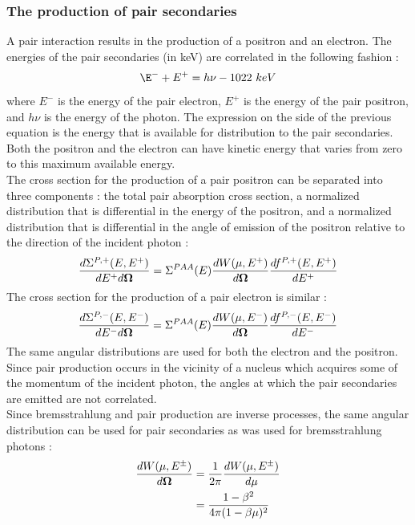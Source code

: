 \subsubsection{The production of pair secondaries}
A pair interaction results in the production of a positron and an electron.
The energies of the pair secondaries (in keV) are correlated in the following
fashion :
\begin{equation}
\E^- + E^+ = h \nu -1022\ keV
\end{equation}
where $E^-$ is the energy of the pair electron, $E^+$ is the
energy of the pair positron, and $h\nu$ is the energy of the photon. The
expression on the side of the previous equation is the energy that is
available for distribution to the pair secondaries. Both the positron and the
electron can have kinetic energy that varies from zero to this maximum
available energy.\\
The cross section for the production of a pair positron can be separated into
three components : the total pair absorption cross section, a normalized
distribution that is differential in the energy of the positron, and a
normalized distribution that is differential in the angle of emission of the
positron relative to the direction of the incident photon :
\begin{equation}
\frac{d\Sigma^{P,+}(E,E^+)}{dE^+ d\boldsymbol{\Omega}} = \Sigma^{PAA}(E)
\frac{dW(\mu,E^+)}{d\boldsymbol{\Omega}} \frac{df^{P,+}(E,E^+)}{dE^+}
\end{equation}
The cross section for the production of a pair electron is similar :
\begin{equation}
\frac{d\Sigma^{P,-}(E,E^-)}{dE^- d\boldsymbol{\Omega}} = \Sigma^{PAA}(E)
\frac{dW(\mu,E^-)}{d\boldsymbol{\Omega}} \frac{df^{P,-}(E,E^-)}{dE^-}
\end{equation}
The same angular distributions are used for both the electron and the
positron. Since pair production occurs in the vicinity of a nucleus which
acquires some of the momentum of the incident photon, the angles at which the
pair secondaries are emitted are not correlated.\\
Since bremsstrahlung and pair production are inverse processes, the same
angular distribution can be used for pair secondaries as was used for
bremsstrahlung photons :
\begin{equation}
\begin{split}
\frac{dW(\mu,E^{\pm})}{d\boldsymbol{\Omega}} &= \frac{1}{2\pi}
\frac{dW(\mu,E^{\pm})}{d\mu}\\
&= \frac{1-\beta^2}{4\pi(1-\beta \mu)^2}
\end{split}
\end{equation}
